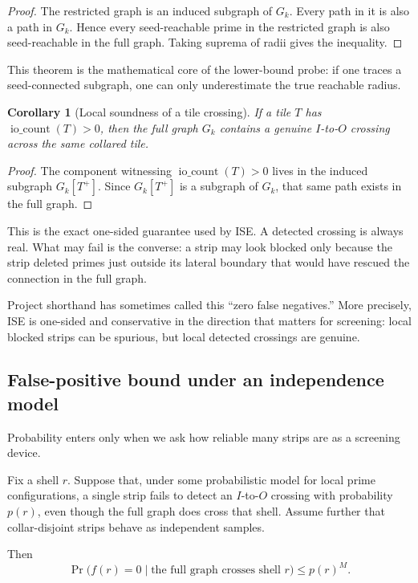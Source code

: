 \documentclass[12pt,letterpaper]{article}
\newtheorem{corollary}[theorem]{Corollary}
\theoremstyle{definition}
\theoremstyle{remark}
\newcommand{\Gk}{G_k}
\newcommand{\Tplus}{T^+}
\newcommand{\iocount}{\operatorname{io\_count}}
\begin{document}
\begin{proof}
The restricted graph is an induced subgraph of $\Gk$. Every path in it is also a path in $\Gk$. Hence every seed-reachable prime in the restricted graph is also seed-reachable in the full graph. Taking suprema of radii gives the inequality.
\end{proof}

This theorem is the mathematical core of the lower-bound probe: if one traces a seed-connected subgraph, one can only underestimate the true reachable radius.

\begin{corollary}[Local soundness of a tile crossing]
If a tile $T$ has $\iocount(T)>0$, then the full graph $\Gk$ contains a genuine $I$-to-$O$ crossing across the same collared tile.
\end{corollary}

\begin{proof}
The component witnessing $\iocount(T)>0$ lives in the induced subgraph $\Gk[\Tplus]$. Since $\Gk[\Tplus]$ is a subgraph of $\Gk$, that same path exists in the full graph.
\end{proof}

This is the exact one-sided guarantee used by ISE. A detected crossing is always real. What may fail is the converse: a strip may look blocked only because the strip deleted primes just outside its lateral boundary that would have rescued the connection in the full graph.

Project shorthand has sometimes called this ``zero false negatives.'' More precisely, ISE is one-sided and conservative in the direction that matters for screening: local blocked strips can be spurious, but local detected crossings are genuine.

\subsection{False-positive bound under an independence model}

Probability enters only when we ask how reliable many strips are as a screening device.

Fix a shell $r$. Suppose that, under some probabilistic model for local prime configurations, a single strip fails to detect an $I$-to-$O$ crossing with probability $p(r)$, even though the full graph does cross that shell. Assume further that collar-disjoint strips behave as independent samples.

Then
\[
\Pr\bigl(f(r)=0 \mid \text{the full graph crosses shell }r\bigr)\le p(r)^M.
\]
\end{document}
